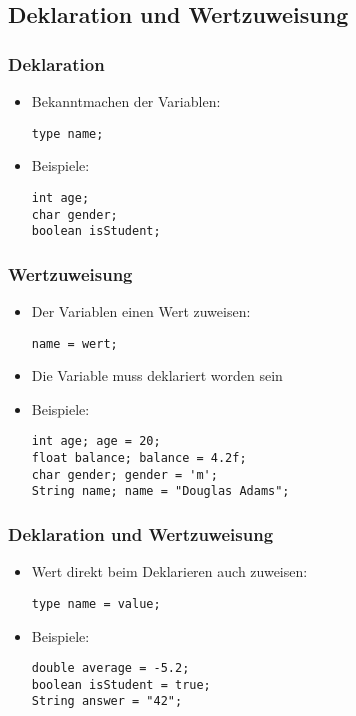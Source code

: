 \documentclass[final]{beamer}
\begin{document}
\subsection{Deklaration und Wertzuweisung}
\begin{frame}[fragile]
  \frametitle{Deklaration}
  \begin{itemize}
  \item Bekanntmachen der Variablen:
    \begin{lstlisting}[morekeywords={type}]
type name;
    \end{lstlisting}
  \item Beispiele:
    \begin{lstlisting}
int age;
char gender;
boolean isStudent;
    \end{lstlisting}
  \end{itemize}
\end{frame}

\begin{frame}[fragile]
  \frametitle{Wertzuweisung}
  \begin{itemize}
  \item Der Variablen einen Wert zuweisen:
    \begin{lstlisting}[morekeywords={type}]
name = wert;
    \end{lstlisting}
  \item Die Variable muss deklariert worden sein
  \item Beispiele:
    \begin{lstlisting}[morekeywords={String}]
int age; age = 20;
float balance; balance = 4.2f;
char gender; gender = 'm';
String name; name = "Douglas Adams";
    \end{lstlisting}
  \end{itemize}
\end{frame}

\begin{frame}[fragile]
  \frametitle{Deklaration und Wertzuweisung}
  \begin{itemize}
  \item Wert direkt beim Deklarieren auch zuweisen:
    \begin{lstlisting}[morekeywords={type}]
type name = value;
    \end{lstlisting}
  \item Beispiele:
    \begin{lstlisting}[morekeywords={String}]
double average = -5.2;
boolean isStudent = true;
String answer = "42";
    \end{lstlisting}
  \end{itemize}
\end{frame}
\end{document}
